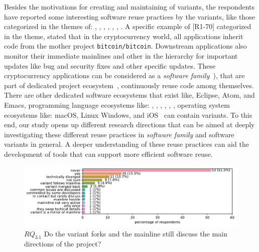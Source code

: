 Besides the motivations for creating and maintaining of variants, the respondents have reported some interesting software reuse practices by the variants, like those categorized in the themes of: , , , , , , . A specific example of [R1-70] categorized in the  theme, stated that in the cryptocurrency world, all applications inherit code from the mother project  \texttt{bitcoin/bitcoin}. Downstream applications also monitor their immediate mainlines and other in the hierarchy for important updates like bug and security fixes and other specific updates. These cryptocurrency applications can be considered as a \textit{software family}~\cite{businge:2018icsme,businge:emse:2021}), that are part of dedicated project ecosystem~\cite{tommens:2020}, continuously reuse code among themselves. 
There are other dedicated software ecosystems that exist like, \textsf{Eclipse}, \textsf{Atom}, and \textsf{Emacs}, programming language ecosystems like:  \java, \cp, \cpp, \py, \go, \rb, operating system ecosystems like: \textsf{macOS}, \textsf{Linux} \textsf{Windows}, and \textsf{iOS}~\cite{tommens:2020} can contain variants.
To this end, our study opens up different research directions that can be aimed at deeply investigating these different reuse practices in \textit{software family} and software variants in general. A deeper understanding of these reuse practices can aid the development of tools that can support more efficient software reuse. 


\begin{figure}[ht]
\begin{center}
    \centering
    \includegraphics[width=\columnwidth]{pdfs/discussions_rq3_colored.pdf}
    \caption{$RQ_{3.1}$ Do the variant forks and the mainline still discuss the main directions of the project?}
    \label{fig:discussions}
\end{center}
\vspace{-.3cm}
\end{figure}

